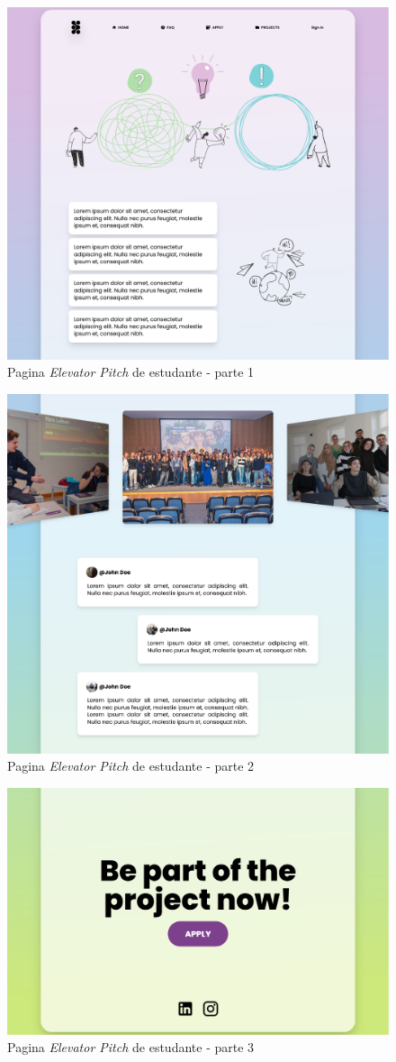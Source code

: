 \begin{figure}[h!tbp]
    \centering
    \includegraphics[width=0.7\linewidth]{capitulos/cap4-implementacao/assets/frontend/blende-website1.png}
    \caption{Pagina \textit{Elevator Pitch} de estudante - parte 1}
    \label{fig:frontend-student-page}
\end{figure}

\begin{figure}[h!tbp]
    \centering
    \includegraphics[width=0.7\linewidth]{capitulos/cap4-implementacao/assets/frontend/blende-website2.png}
    \caption{Pagina \textit{Elevator Pitch} de estudante - parte 2}
    \label{fig:frontend-student-page}
\end{figure}

\begin{figure}[h!tbp]
    \centering
    \includegraphics[width=0.7\linewidth]{capitulos/cap4-implementacao/assets/frontend/blende-website3.png}
    \caption{Pagina \textit{Elevator Pitch} de estudante - parte 3}
    \label{fig:frontend-student-page}
\end{figure}

